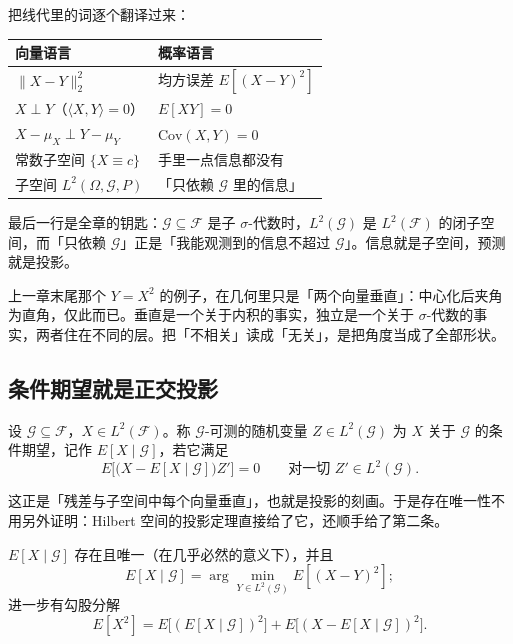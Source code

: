 把线代里的词逐个翻译过来：

\begin{center}
\begin{tabular}{ll}
\hline
向量语言 & 概率语言\\
\hline
$\|X-Y\|_2^2$ & 均方误差 $E[(X-Y)^2]$\\
$X\perp Y$（$\langle X,Y\rangle=0$） & $E[XY]=0$\\
$X-\mu_X\perp Y-\mu_Y$ & $\mathrm{Cov}(X,Y)=0$\\
常数子空间 $\{X\equiv c\}$ & 手里一点信息都没有\\
子空间 $L^2(\Omega,\mathcal{G},P)$ & 「只依赖 $\mathcal{G}$ 里的信息」\\
\hline
\end{tabular}
\end{center}

最后一行是全章的钥匙：$\mathcal{G}\subseteq\mathcal{F}$ 是子 $\sigma$-代数时，$L^2(\mathcal{G})$ 是 $L^2(\mathcal{F})$ 的闭子空间，而「只依赖 $\mathcal{G}$」正是「我能观测到的信息不超过 $\mathcal{G}$」。信息就是子空间，预测就是投影。

\begin{remark}[正交不等于没关系]
上一章末尾那个 $Y=X^2$ 的例子，在几何里只是「两个向量垂直」：中心化后夹角为直角，仅此而已。垂直是一个关于内积的事实，独立是一个关于 $\sigma$-代数的事实，两者住在不同的层。把「不相关」读成「无关」，是把角度当成了全部形状。
\end{remark}

\subsection{条件期望就是正交投影}

\begin{definition}
设 $\mathcal{G}\subseteq\mathcal{F}$，$X\in L^2(\mathcal{F})$。称 $\mathcal{G}$-可测的随机变量 $Z\in L^2(\mathcal{G})$ 为 $X$ 关于 $\mathcal{G}$ 的条件期望，记作 $E[X\mid\mathcal{G}]$，若它满足
\[
E\Big[\big(X-E[X\mid\mathcal{G}]\big)Z'\Big]=0
\qquad\text{对一切 }Z'\in L^2(\mathcal{G}).
\]
\end{definition}

这正是「残差与子空间中每个向量垂直」，也就是投影的刻画。于是存在唯一性不用另外证明：Hilbert 空间的投影定理直接给了它，还顺手给了第二条。

\begin{theorem}[投影即最佳逼近]
$E[X\mid\mathcal{G}]$ 存在且唯一（在几乎必然的意义下），并且
\[
E[X\mid\mathcal{G}]=\arg\min_{Y\in L^2(\mathcal{G})}E[(X-Y)^2];
\]
进一步有勾股分解
\[
E[X^2]=E\big[(E[X\mid\mathcal{G}])^2\big]+E\big[(X-E[X\mid\mathcal{G}])^2\big].
\]
\end{theorem}

